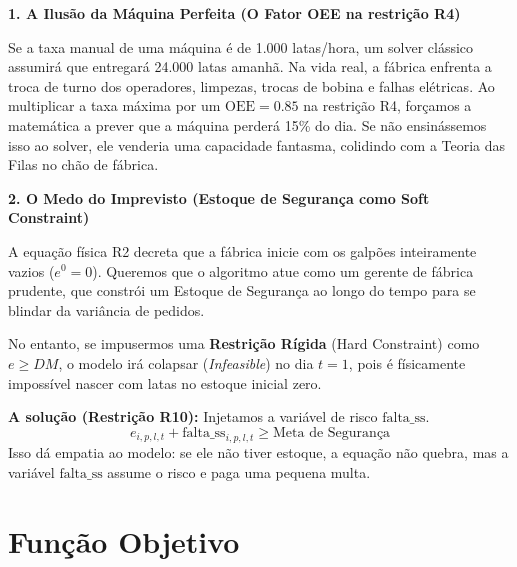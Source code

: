 \documentclass[12pt, a4paper]{article}
\begin{document}
\vspace{6pt}
\begin{mdframed}[style=destaque]
\textbf{\color{ballblue}1. A Ilus\~{a}o da M\'{a}quina Perfeita (O Fator OEE na restri\c{c}\~{a}o R4)}

\medskip
Se a taxa manual de uma m\'{a}quina \'{e} de 1.000 latas/hora, um solver cl\'{a}ssico assumir\'{a} que entregar\'{a} 24.000 latas amanh\~{a}. Na vida real, a f\'{a}brica enfrenta a troca de turno dos operadores, limpezas, trocas de bobina e falhas el\'{e}tricas. Ao multiplicar a taxa m\'{a}xima por um $\text{OEE} = 0.85$ na restri\c{c}\~{a}o R4, for\c{c}amos a matem\'{a}tica a prever que a m\'{a}quina perder\'{a} 15\% do dia. Se n\~{a}o ensin\'{a}ssemos isso ao solver, ele venderia uma capacidade fantasma, colidindo com a Teoria das Filas no ch\~{a}o de f\'{a}brica.
\end{mdframed}

\vspace{8pt}
\begin{mdframed}[style=destaque]
\textbf{\color{ballblue}2. O Medo do Imprevisto (Estoque de Seguran\c{c}a como Soft Constraint)}

\medskip
A equa\c{c}\~{a}o f\'{i}sica R2 decreta que a f\'{a}brica inicie com os galp\~{o}es inteiramente vazios ($e^0 = 0$). Queremos que o algoritmo atue como um gerente de f\'{a}brica prudente, que constr\'{o}i um Estoque de Seguran\c{c}a ao longo do tempo para se blindar da vari\^{a}ncia de pedidos.

No entanto, se impusermos uma \textbf{Restri\c{c}\~{a}o R\'{i}gida} (Hard Constraint) como $e \ge DM$, o modelo ir\'{a} colapsar (\textit{Infeasible}) no dia $t=1$, pois \'{e} f\'{i}sicamente imposs\'{i}vel nascer com latas no estoque inicial zero.

\medskip
\textbf{A solu\c{c}\~{a}o (Restri\c{c}\~{a}o R10):} Injetamos a vari\'{a}vel de risco $\text{falta\_ss}$. 
\[ e_{i,p,l,t} + \text{falta\_ss}_{i,p,l,t} \geq \text{Meta de Seguran\c{c}a} \]
Isso d\'{a} empatia ao modelo: se ele n\~{a}o tiver estoque, a equa\c{c}\~{a}o n\~{a}o quebra, mas a vari\'{a}vel $\text{falta\_ss}$ assume o risco e paga uma pequena multa.
\end{mdframed}

\section{Fun\c{c}\~{a}o Objetivo}
\end{document}
